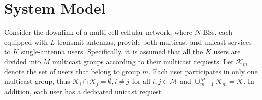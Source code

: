 \documentclass[12pt, draftclsnofoot, onecolumn]{IEEEtran}
\begin{document}
\section{System Model}
Consider the downlink of a multi-cell cellular network, where $N$ BSs, each equipped with $L$ transmit antennas, provide both multicast and unicast services to $K$ single-antenna users. Specifically, it is assumed that all the $K$ users are divided into $M$ multicast groups according to their multicast requests. Let $\mathcal{K}_m$ denote the set of users that belong to group $m$. Each user participates in only one multicast group, thus $\mathcal{K}_i \cap \mathcal{K}_j = \emptyset, i \neq j$ for all $ i, j \in \mathcal{M}$ and $\cup_{m = 1}^M \mathcal{K}_m = \mathcal{K}$. In addition, each user has a dedicated unicast request


\end{document}
